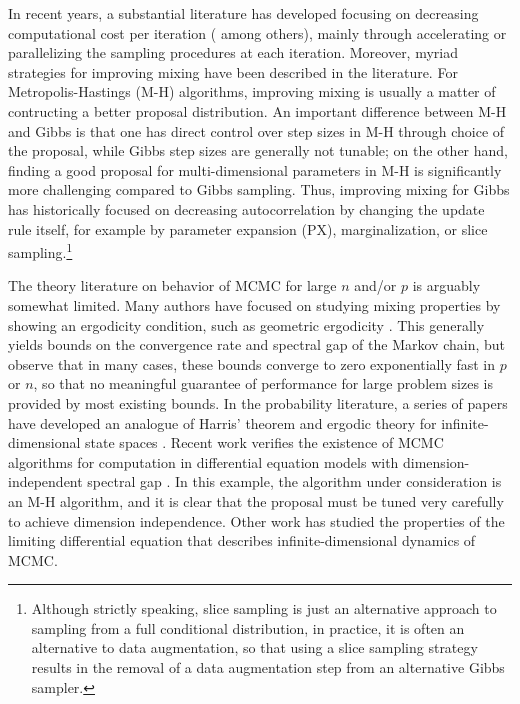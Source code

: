 \documentclass[10pt]{article}
\begin{document}
In recent years, a substantial literature has developed focusing on decreasing computational cost per iteration (\cite{minsker2014robust,srivastava2015wasp,conrad2015accelerating} among others), mainly through accelerating or parallelizing the sampling procedures at each iteration. Moreover, myriad strategies for improving mixing have been described in the literature. For Metropolis-Hastings (M-H) algorithms, improving mixing is usually a matter of contructing a better proposal distribution. An important difference between M-H and Gibbs is that one has direct control over step sizes in M-H through choice of the proposal, while Gibbs step sizes are generally not tunable; on the other hand, finding a good proposal for multi-dimensional parameters in M-H is significantly more challenging compared to Gibbs sampling. Thus, improving mixing for Gibbs has historically focused on decreasing autocorrelation by changing the update rule itself, for example by parameter expansion (PX), marginalization, or slice sampling.\footnote{Although strictly speaking, slice sampling is just an alternative approach to sampling from a full conditional distribution, in practice, it is often an alternative to data augmentation, so that using a slice sampling strategy results in the removal of a data augmentation step from an alternative Gibbs sampler.} 

The theory literature on behavior of MCMC for large $n$ and/or $p$ is arguably somewhat limited. Many authors have focused on studying mixing properties by showing 
an ergodicity condition, such as geometric ergodicity \citep{roberts2004general,meyn2012markov}. This generally yields bounds on the convergence rate and spectral gap of the Markov chain, but \cite{rajaratnam2015mcmc} observe that in many cases, these bounds converge to zero exponentially fast in $p$ or $n$, so that no meaningful guarantee of performance for large problem sizes is provided by most existing bounds. In the probability literature, a series of papers have developed an analogue of Harris' theorem and ergodic theory for infinite-dimensional state spaces \citep{hairer2011asymptotic}. Recent work verifies the existence of MCMC algorithms for computation in differential equation models with dimension-independent spectral gap \citep{hairer2014spectral}. In this example, the algorithm under consideration is an M-H algorithm, and it is clear that the proposal must be tuned very carefully to achieve dimension independence. Other work has studied the properties of the limiting differential equation that describes infinite-dimensional dynamics of MCMC.
\end{document}
